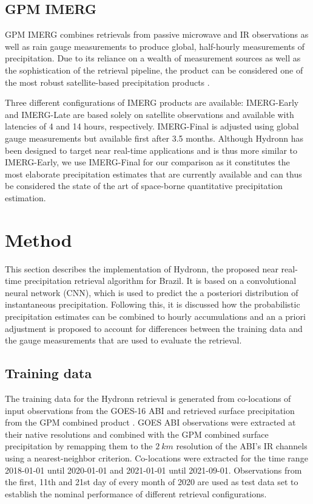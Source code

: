 \documentclass[journal abbreviation, manuscript]{copernicus}
\begin{document}
\subsection{GPM IMERG}

GPM IMERG \citep{huffman20} combines retrievals from passive microwave and IR
observations as well as rain gauge measurements to produce global, half-hourly
measurements of precipitation. Due to its reliance on a wealth of measurement
sources as well as the sophistication of the retrieval pipeline, the product can
be considered one of the most robust satellite-based precipitation products
\citep{pradhan22}.

Three different configurations of IMERG products are available: IMERG-Early and
IMERG-Late are based solely on satellite observations and available with
latencies of 4 and 14 hours, respectively. IMERG-Final is adjusted using global
gauge measurements but available first after 3.5 months. Although Hydronn has
been designed to target near real-time applications and is thus more similar to
IMERG-Early, we use IMERG-Final for our comparison as it constitutes the most
elaborate precipitation estimates that are currently available and can thus be
considered the state of the art of space-borne quantitative precipitation
estimation.

\section{Method}

This section describes the implementation of Hydronn, the proposed near
real-time precipitation retrieval algorithm for Brazil. It is based on a
convolutional neural network (CNN), which is used to predict the a posteriori
distribution of instantaneous precipitation. Following this, it is discussed how
the probabilistic precipitation estimates can be combined to hourly
accumulations and an a priori adjustment is proposed to account for differences
between the training data and the gauge measurements that are used to evaluate
the retrieval.


\subsection{Training data}

The training data for the Hydronn retrieval is generated from co-locations of
input observations from the GOES-16 ABI \citep{schmit18} and retrieved surface
precipitation from the GPM combined product \citep{grecu16}. GOES ABI
observations were extracted at their native resolutions and combined with the
GPM combined surface precipitation by remapping them to the $2\ \unit{km}$
resolution of the ABI's IR channels using a nearest-neighbor criterion.
Co-locations were extracted for the time range 2018-01-01 until 2020-01-01 and
2021-01-01 until 2021-09-01. Observations from the first, 11th and 21st day of
every month of 2020 are used as test data set to establish the nominal
performance of different retrieval configurations.
\end{document}
